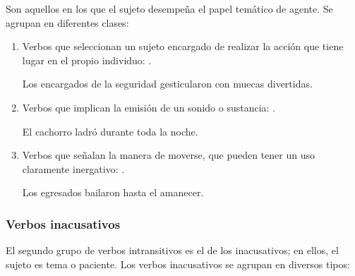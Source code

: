 Son aquellos en los que el sujeto desempeña el papel temático de agente. Se
agrupan en diferentes clases:

\begin{enumerate}[label=\alph*)]
  \item Verbos que seleccionan un sujeto encargado de realizar la acción que
        tiene lugar en el propio individuo: .
        \begin{exe}
          \ex Los encargados de la seguridad gesticularon con muecas divertidas.
        \end{exe}
  \item Verbos que implican la emisión de un sonido o sustancia: .
        \begin{exe}
          \ex El cachorro ladró durante toda la noche.
        \end{exe}
  \item Verbos que señalan la manera de moverse, que pueden tener un uso
        claramente inergativo: .
        \begin{exe}
          \ex Los egresados bailaron hasta el amanecer.
        \end{exe}
\end{enumerate}

\subsubsection{Verbos inacusativos}\label{sec:07-inacusativos}

El segundo grupo de verbos intransitivos es el de los inacusativos; en ellos, el
sujeto es tema o paciente. Los verbos inacusativos se agrupan en diversos tipos:

